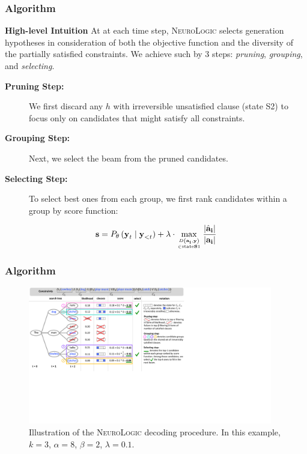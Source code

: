 \documentclass[10pt,aspectratio=43]{beamer}
\newcommand{\methodshort}{\frenchspacing\textsc{NeuroLogic}\xspace}
\begin{document}
    \begin{frame}
        \frametitle{\textbf{Algorithm}}
        \begin{block}{\textbf{High-level Intuition}}
            At at each time step, \methodshort{} selects generation hypotheses in consideration of both the objective function and the diversity of the partially satisfied constraints. We achieve such by 3 steps: \emph{pruning}, \emph{grouping}, and \emph{selecting}.
            \begin{description}
                \item[\textbf{Pruning Step:}] We first discard any $h$ with irreversible unsatisfied clause (state S2) to focus only on candidates that might satisfy all constraints.
                \item[\textbf{Grouping Step:}] Next, we select the beam from the pruned candidates.
                \item[\textbf{Selecting Step:}] To select best ones from each group, we first rank candidates within a group by score function:
            \end{description}
            \begin{equation}
                \textbf{s}= P_{\theta}\left(\textbf{y}_{t} \mid \textbf{y}_{<t}\right)+\lambda \cdot \max _{D\left(\textbf{a}_{\textbf{i}}, \textbf{y}\right) \atop \in \text {state} \textbf{S}1} \frac{\left|\hat{\textbf{a}}_{\textbf{i}}\right|}{\left|\textbf{a}_{\textbf{i}}\right|}
            \end{equation}            
        \end{block}
    \end{frame}
    
    \begin{frame}
        \frametitle{\textbf{Algorithm}}
        \begin{figure}
            \centering
            \includegraphics[width=4.2in]{figures/algorithm.pdf}
            \caption{Illustration of the \methodshort decoding procedure. In this example, $k=3$, $\alpha=8$, $\beta=2$, $\lambda=0.1$.}
            \label{fig:algorithm}
        \end{figure}
    \end{frame}
    
\end{document}
